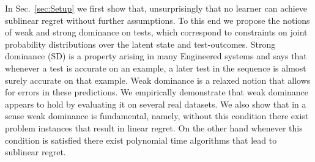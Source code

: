 \documentclass[11pt]{article} %
\newcommand{\todoc}[2][]{\todo[color=Apricot!20,size=\tiny,#1]{Cs: #2}}
\newcommand{\todov}[2][]{\todo[color=Purple!20,size=\tiny,#1]{V: #2}}
\newcommand{\ses}{sensor selection\xspace}
\begin{document}


In Sec.~\ref{sec:Setup} we first show that, unsurprisingly that no learner can achieve sublinear regret without further assumptions. %
To this end we propose the notions of weak and strong dominance on tests, which correspond to constraints on joint probability distributions over the latent state and test-outcomes. Strong dominance (SD) is a property arising in many Engineered systems and says that whenever a test is accurate on an example, a later test in the sequence is almost surely accurate on that example. %
Weak dominance is a relaxed notion that allows for errors in these predictions. We empirically demonstrate that weak dominance appears to hold by evaluating it on several real datasets. We also show that in a sense weak dominance is fundamental, namely, without this condition there exist problem instances that result in linear regret. On the other hand whenever this condition is satisfied there exist polynomial time algorithms that lead to sublinear regret. 
\end{document}
